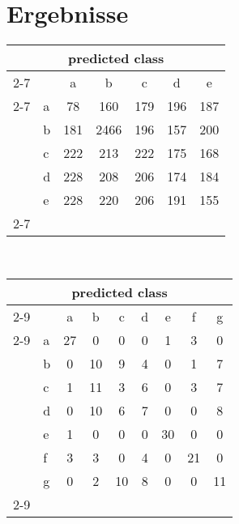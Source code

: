 \chapter{Ergebnisse}
\begin{tabular}{ l | l | c c c c c |}
\multicolumn{7}{c}{\textbf{predicted class}}\\
\cline{2-7}
\multirow{6}{*}{\begin{turn}{90}\textbf{actual value}\end{turn}}
& & a & b & c & d & e\\
\cline{2-7}
& a & 78 & 160 & 179 & 196 & 187 \\
& b & 181 & 2466 & 196 & 157 & 200 \\
& c & 222 & 213 & 222 & 175 & 168 \\
& d & 228 & 208 & 206 & 174 & 184 \\
& e & 228 & 220 & 206 & 191 & 155 \\
\cline{2-7}
\end{tabular}
\\
\begin{tabular}{ l | l |  c  c  c  c  c  c  c |}
\multicolumn{9}{c}{\textbf{predicted class}}\\
\cline{2-9}
\multirow{8}{*}{\begin{turn}{90}\textbf{actual value}\end{turn}}
 &  & a & b & c & d & e & f & g\\
\cline{2-9}
& a & 27 & 0 & 0 & 0 & 1 & 3 & 0\\
& b & 0 & 10 & 9 & 4 & 0 & 1 & 7\\
& c & 1 & 11 & 3 & 6 & 0 & 3 & 7\\
& d & 0 & 10 & 6 & 7 & 0 & 0 & 8\\
& e & 1 & 0 & 0 & 0 & 30 & 0 & 0\\
& f & 3 & 3 & 0 & 4 & 0 & 21 & 0\\
& g & 0 & 2 & 10 & 8 & 0 & 0 & 11\\
\cline{2-9}
\end{tabular}